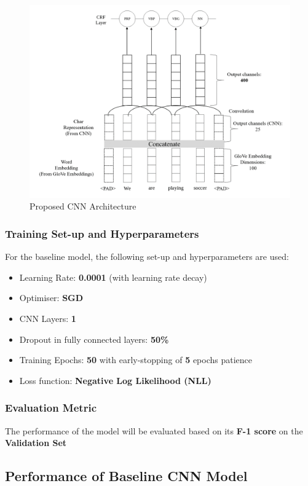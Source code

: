 \documentclass[sigconf,nonacm=true]{acmart}
\begin{document}
\begin{figure}[H]
	\centering
	\includegraphics[scale=0.4]{figures/cnn.png}
	\caption{Proposed CNN Architecture}
	\label{fig:cnnarch}
\end{figure}

\subsubsection{Training Set-up and Hyperparameters} \label{subsubsection:baselinesetup}
For the baseline model, the following set-up and hyperparameters are used:
\begin{itemize}
	\item Learning Rate: \textbf{0.0001} (with learning rate decay)
	\item Optimiser: \textbf{SGD}
	\item CNN Layers: \textbf{1}
	\item Dropout in fully connected layers: \textbf{50\%}
	\item Training Epochs: \textbf{50} with early-stopping of \textbf{5} epochs patience
	\item Loss function: \textbf{Negative Log Likelihood (NLL)}
\end{itemize}

\subsubsection{Evaluation Metric}
The performance of the model will be evaluated based on its \textbf{F-1 score} on the \textbf{Validation Set}

\subsection{Performance of Baseline CNN Model}
\end{document}
